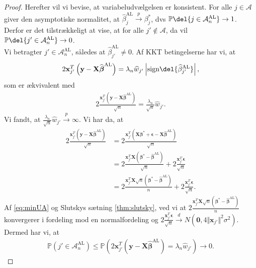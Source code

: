 \begin{proof}
Herefter vil vi bevise, at variabeludvælgelsen er konsistent. For alle $j \in \mathcal{A}$ giver den asymptotiske normalitet, at $\widehat{\beta}_j^{\text{AL}} \overset{p}{\rightarrow}\beta_j^{*}$, dvs $\mathbb{P} \del{j \in \mathcal{A}_n^{\text{AL}}} \rightarrow 1$. Derfor er det tilstrækkeligt at vise, at for alle $j' \notin \mathcal{A}$, da vil $\mathbb{P} \del{j' \in \mathcal{A}_n^{\text{AL}}} \rightarrow 0$. \\
Vi betragter $j' \in \mathcal{A}_n^{\text{AL}}$, således at $\widehat{\beta}_{j'}^{\text{AL}} \neq 0$. Af KKT betingelserne har vi, at 
\begin{align*}
2 \mathbf{x}_{j'}^T  \left( \mathbf{y}-\mathbf{X}\widehat{\boldsymbol{\beta}}^{\text{AL}} \right)=\lambda_n \widehat{w}_{j'} \left\vert \text{sign} \del{\widehat{\beta}_{j'}^\text{AL}} \right\vert,
\end{align*}
som er ækvivalent med
\begin{align*}
2 \frac{\mathbf{x}_{j'}^T \left( \mathbf{y}-\mathbf{X}\widehat{\boldsymbol{\beta}}^{{\text{AL}}}\right)}{\sqrt{n}}=\frac{\lambda_n}{\sqrt{n}} \widehat{w}_{j'}.
\end{align*}
Vi fandt, at $\frac{\lambda_n}{\sqrt{n}} \widehat{w}_{j'} \overset{p}{\rightarrow} \infty$. Vi har da, at 
\begin{align*}
2 \frac{\mathbf{x}_{j'}^T \left(\mathbf{y}-\mathbf{X}\widehat{\boldsymbol{\beta}}^{{\text{AL}}} \right)}{\sqrt{n}}
 &= 2 \frac{\mathbf{x}_{j'}^T \left(\mathbf{X}\boldsymbol{\beta}^*+\boldsymbol{\epsilon}-\mathbf{X}\widehat{\boldsymbol{\beta}}^{{\text{AL}}} \right) }{\sqrt{n}} \\
&= 2 \frac{\mathbf{x}_{j'}^T \mathbf{X} \left(\boldsymbol{\beta}^*-\widehat{\boldsymbol{\beta}}^{\text{AL}} \right)}{\sqrt{n}}+2\frac{\mathbf{x}_{j'}^T \boldsymbol{\epsilon}}{\sqrt{n}} \\
&= 2 \frac{\mathbf{x}_{j'}^T \mathbf{X} \sqrt{n} \left(\boldsymbol{\beta}^*-\widehat{\boldsymbol{\beta}}^{\text{AL}}\right)}{n}+2\frac{\mathbf{x}_{j'}^T \boldsymbol{\epsilon}}{\sqrt{n}}.
\end{align*}
Af \eqref{eq:minUA} og Slutskys sætning \ref{thm:slutsky}, ved vi at $ 2 \frac{\mathbf{x}_{j'}^T \mathbf{X} \sqrt{n} \left(\boldsymbol{\beta}^*-\widehat{\boldsymbol{\beta}}^{\text{AL}}\right)}{n}$ konvergerer i fordeling mod en normalfordeling og $2\frac{\mathbf{x}_{j'}^T \boldsymbol{\epsilon}}{\sqrt{n}} \overset{d}{\rightarrow} N \left(\mathbf{0}, 4 \Vert \mathbf{x}_{j'} \Vert^2 \sigma^2 \right)$. Dermed har vi, at
\begin{align*}
\mathbb{P} \left(j' \in \mathcal{A}_n^{\text{AL}}\right) \leq \mathbb{P} \left(2 \mathbf{x}_{j'}^T \left(\mathbf{y}-\mathbf{X} \widehat{\boldsymbol{\beta}}^{\text{AL}}\right)=\lambda_n \widehat{w}_{j'} \right) \rightarrow 0.
\end{align*}
\end{proof}
%
